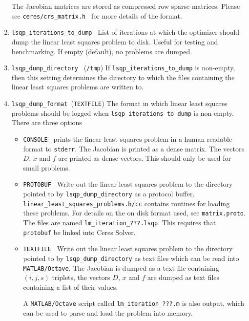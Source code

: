 \begin{enumerate}
The Jacobian matrices are stored as compressed row sparse
matrices. Please see \texttt{ceres/crs\_matrix.h } for more details of
the format.

\item{\texttt{lsqp\_iterations\_to\_dump }} List of iterations at
  which the optimizer should dump the linear least squares problem to
  disk. Useful for testing and benchmarking. If empty (default), no
  problems are dumped.

\item{\texttt{lsqp\_dump\_directory }} (\texttt{/tmp})
 If \texttt{lsqp\_iterations\_to\_dump} is non-empty, then this
 setting determines the directory to which the files containing the
 linear least squares problems are written to.


\item{\texttt{lsqp\_dump\_format }}(\texttt{TEXTFILE}) The format in
  which linear least squares problems should be logged
when \texttt{lsqp\_iterations\_to\_dump} is non-empty.  There are three options
\begin{itemize}
\item{\texttt{CONSOLE }} prints the linear least squares problem in a human readable format
  to \texttt{stderr}. The Jacobian is printed as a dense matrix. The vectors
   $D$, $x$ and $f$ are printed as dense vectors. This should only be used
   for small problems.
\item{\texttt{PROTOBUF }}
   Write out the linear least squares problem to the directory
   pointed to by \texttt{lsqp\_dump\_directory} as a protocol
   buffer. \texttt{linear\_least\_squares\_problems.h/cc} contains routines for
   loading these problems. For details on the on disk format used,
   see \texttt{matrix.proto}. The files are named
   \texttt{lm\_iteration\_???.lsqp}. This requires that
   \texttt{protobuf} be linked into Ceres Solver.
\item{\texttt{TEXTFILE }}
   Write out the linear least squares problem to the directory
   pointed to by \texttt{lsqp\_dump\_directory} as text files
   which can be read into \texttt{MATLAB/Octave}. The Jacobian is dumped as a
   text file containing $(i,j,s)$ triplets, the vectors $D$, $x$ and $f$ are
   dumped as text files containing a list of their values.

   A \texttt{MATLAB/Octave} script called \texttt{lm\_iteration\_???.m} is also output,
   which can be used to parse and load the problem into memory.
\end{itemize}




\end{enumerate}
